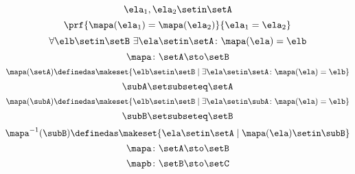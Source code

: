 {\begin{forslides}
        \begin{equation}
            \label{eq:slides_session2_122}
            \ela_1, \ela_2 \setin\setA
        \end{equation}
        \begin{equation}
            \label{eq:slides_session2_123}
            \prf{\mapa(\ela_1) = \mapa(\ela_2)}{\ela_1 = \ela_2}
        \end{equation}
        \begin{equation}
            \label{eq:slides_session2_124}
            \forall \elb \setin\setB \ \exists  \ela \setin\setA \colon \mapa(\ela) = \elb
        \end{equation}
        \begin{equation}
            \label{eq:slides_session2_125}
            \mapa\colon \setA \sto \setB
        \end{equation}
        \begin{equation}
            \label{eq:slides_session2_126}
            \mapa(\setA) \definedas \makeset{ \elb \setin\setB \mid \exists \ela \setin\setA \colon \mapa(\ela) = \elb }
        \end{equation}
        \begin{equation}
            \label{eq:slides_session2_127}
            \subA \setsubseteq \setA
        \end{equation}
        \begin{equation}
            \label{eq:slides_session2_128}
            \mapa(\subA) \definedas \makeset{ \elb \setin\setB \mid \exists \ela \setin \subA \colon \mapa(\ela) = \elb }
        \end{equation}
        \begin{equation}
            \label{eq:slides_session2_129}
            \subB \setsubseteq \setB
        \end{equation}
        \begin{equation}
            \label{eq:slides_session2_130}
            \mapa^{-1}(\subB) \definedas \makeset{ \ela \setin\setA \mid  \mapa(\ela) \setin \subB}
        \end{equation}
        \begin{equation}
            \label{eq:slides_session2_131}
            \mapa\colon \setA \sto \setB
        \end{equation}
        \begin{equation}
            \label{eq:slides_session2_132}
            \mapb \colon \setB \sto \setC
        \end{equation}

\end{forslides}}
